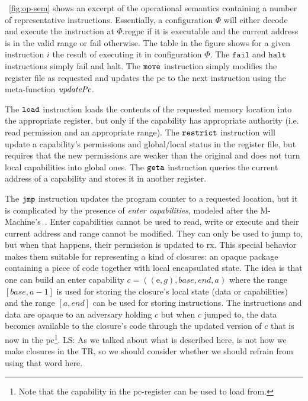 \documentclass[compsoc,conference,letterpaper,fleqn]{IEEEtran}
\newcommand\lau[1]{{\color{purple} \sf \footnotesize {LS: #1}}\\}
\newcommand{\var}[1]{\mathit{#1}}
\newcommand{\gl}{\var{g}}
\newcommand{\pcreg}{\mathrm{pc}}
\newcommand{\addr}{\var{a}}
\newcommand{\start}{\var{base}}
\newcommand{\addrend}{\var{end}}
\newcommand{\plainproj}[1]{\mathrm{#1}}
\newcommand{\memreg}[1][\Phi]{#1.\plainproj{reg}}
\newcommand{\plainfun}[2]{
  \ifthenelse{\equal{#2}{}}
  {\mathit{#1}}
  {\mathit{#1}(#2)}
}
\newcommand{\stdUpdatePc}[1]{\plainfun{updatePc}{#1}}
\newcommand{\zinstr}[1]{\mathtt{#1}}
\newcommand{\fail}{\zinstr{fail}}
\newcommand{\halt}{\zinstr{halt}}
\newcommand{\oneinstr}[2]{
  \ifthenelse{\equal{#2}{}}
  {\zinstr{#1}}
  {\zinstr{#1} \; #2}
}
\newcommand{\jmp}[1]{\oneinstr{jmp}{#1}}
\newcommand{\twoinstr}[3]{
  \ifthenelse{\equal{#2#3}{}}
  {\zinstr{#1}}
  {\zinstr{#1} \; #2 \; #3}
}
\newcommand{\restricttwo}[2]{\twoinstr{restrict}{#1}{#2}}
\newcommand{\geta}[2]{\twoinstr{geta}{#1}{#2}}
\newcommand{\move}[2]{\twoinstr{move}{#1}{#2}}
\newcommand{\load}[2]{\twoinstr{load}{#1}{#2}}
\newcommand{\plainperm}[1]{\mathrm{#1}}
\newcommand{\exec}{\plainperm{rx}}
\newcommand{\entry}{\plainperm{e}}
\begin{document}
\figurename~\ref{fig:op-sem} shows an excerpt of the operational semantics containing a number of representative
instructions. Essentially, a configuration $\Phi$ will either decode and execute
the instruction at $\memreg{\pcreg}$ if it is executable and the current address
is in the valid range or fail otherwise. The table in the figure shows for a
given instruction $i$ the result of executing it in configuration $\Phi$. The
$\fail$ and $\halt$ instructions simply fail and halt. The $\move{}{}$
instruction simply modifies the register file as requested and updates the
$\pcreg$ to the next instruction using the meta-function $\stdUpdatePc{}$.

The $\load{}{}$ instruction loads the contents of the requested memory location
into the appropriate register, but only if the capability has appropriate
authority (i.e. read permission and an appropriate range). The $\restricttwo{}{}$
instruction will update a capability's permissions and global/local status in
the register file, but requires that the new permissions are weaker than the
original and does not turn local capabilities into global ones. The $\geta{}{}$
instruction queries the current address of a capability and stores it in another
register.

The $\jmp{}$ instruction updates the program counter to a requested location,
but it is complicated by the presence of \emph{enter capabilities}, modeled
after the M-Machine's~\cite{Carter:1994:HSF:195473.195579}. Enter capabilities
cannot be used to read, write or execute and their current address and range
cannot be modified. They can only be used to jump to, but when that happens,
their permission is updated to $\exec$. This special behavior makes them
suitable for representing a kind of closures: an opaque package containing a
piece of code together with local encapsulated state. The idea is that one can
build an enter capability $c = ((\entry,\gl),\start,\addrend,\addr)$ where the
range $[\start,\addr-1]$ is used for storing the closure's local state (data or
capabilities) and the range $[\addr,\addrend]$ can be used for storing
instructions. The instructions and data are opaque to an adversary holding $c$
but when $c$ jumped to, the data becomes available to the closure's code through
the updated version of $c$ that is now in the $\pcreg$\footnote{Note that the
  capability in the $\pcreg$-register can be used to load from.}. \lau{As we
  talked about what is described here, is not how we make closures in the TR, so
  we should consider whether we should refrain from using that word here. }
\end{document}
